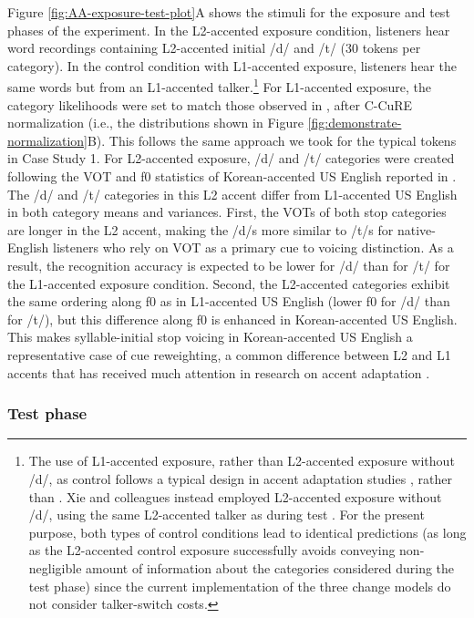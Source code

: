 \documentclass[
  11pt,
  man,floatsintext]{apa6}
\begin{document}
Figure \ref{fig:AA-exposure-test-plot}A shows the stimuli for the exposure and test phases of the experiment. In the L2-accented exposure condition, listeners hear word recordings containing L2-accented initial /d/ and /t/ (30 tokens per category). In the control condition with L1-accented exposure, listeners hear the same words but from an L1-accented talker.\footnote{The use of L1-accented exposure, rather than L2-accented exposure without /d/, as control follows a typical design in accent adaptation studies \autocite[e.g.,][]{bradlow-bent2008}, rather than \textcite{xie2016jep}. Xie and colleagues instead employed L2-accented exposure without /d/, using the same L2-accented talker as during test \autocite[see also][]{eisner2013}. For the present purpose, both types of control conditions lead to identical predictions (as long as the L2-accented control exposure successfully avoids conveying non-negligible amount of information about the categories considered during the test phase) since the current implementation of the three change models do not consider talker-switch costs.} For L1-accented exposure, the category likelihoods were set to match those observed in \textcite{chodroff-wilson2018}, after C-CuRE normalization (i.e., the distributions shown in Figure \ref{fig:demonstrate-normalization}B). This follows the same approach we took for the typical tokens in Case Study 1. For L2-accented exposure, /d/ and /t/ categories were created following the VOT and f0 statistics of Korean-accented US English reported in \textcite{schertz2015}. The /d/ and /t/ categories in this L2 accent differ from L1-accented US English in both category means and variances. First, the VOTs of both stop categories are longer in the L2 accent, making the /d/s more similar to /t/s for native-English listeners who rely on VOT as a primary cue to voicing distinction. As a result, the recognition accuracy is expected to be lower for /d/ than for /t/ for the L1-accented exposure condition. Second, the L2-accented categories exhibit the same ordering along f0 as in L1-accented US English (lower f0 for /d/ than for /t/), but this difference along f0 is enhanced in Korean-accented US English. This makes syllable-initial stop voicing in Korean-accented US English a representative case of cue reweighting, a common difference between L2 and L1 accents that has received much attention in research on accent adaptation \autocites[e.g.,][]{escudero2009,kim2020,schertz2016}[see also][]{idemaru-holt2011,idemaru-holt2020,harmon2019}.

\subsubsection{Test phase}\label{test-phase-1}
\end{document}
